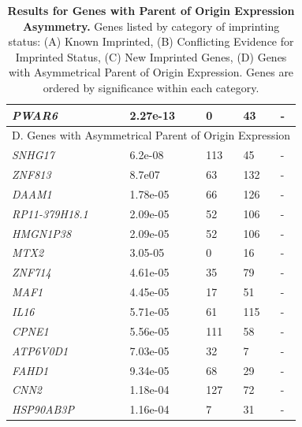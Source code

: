 \begin{table}
\begin{adjustbox}{width={\textwidth}}
\begin{tabular}{@{}p{3cm}|p{2cm}p{5cm}p{5cm}p{6cm}@{}}
 \emph{PWAR6} & 2.27e-13 & 0 & 43 & - \\ \midrule
 \multicolumn{5}{c}{D. Genes with Asymmetrical Parent of Origin Expression}  \\ \midrule
 \emph{SNHG17} & 6.2e-08 & 113 & 45 & - \\
 \emph{ZNF813} & 8.7e07 & 63 & 132 & - \\
 \emph{DAAM1} & 1.78e-05 & 66 & 126 & -\\
 \emph{RP11-379H18.1} & 2.09e-05 & 52 & 106 & - \\
 \emph{HMGN1P38} & 2.09e-05 & 52 & 106 & - \\
 \emph{MTX2} & 3.05-05 & 0 & 16 & - \\
\emph{ZNF714} & 4.61e-05 & 35 & 79 & - \\
\emph{MAF1} & 4.45e-05 & 17 & 51 & - \\
\emph{IL16} & 5.71e-05 & 61 & 115 & - \\
\emph{CPNE1} & 5.56e-05 & 111 & 58 & - \\
\emph{ATP6V0D1} & 7.03e-05 & 32 & 7  & - \\
\emph{FAHD1} & 9.34e-05 & 68 & 29 & - \\
\emph{CNN2} & 1.18e-04 & 127 & 72 & -\\
\emph{HSP90AB3P} & 1.16e-04 & 7 & 31 & - \\ \bottomrule
\end{tabular}
\end{adjustbox}
\caption[Results for Genes with Parent of Origin Expression Asymmetry. ]{\textbf{Results for Genes with Parent of Origin Expression Asymmetry. }
Genes listed by category of imprinting status: (A) Known Imprinted, (B) Conflicting Evidence for Imprinted Status, (C) New Imprinted Genes, (D) Genes with Asymmetrical Parent of Origin Expression. Genes are ordered by significance within each category.}
\label{tab:imprintedgenes}
\end{table}





